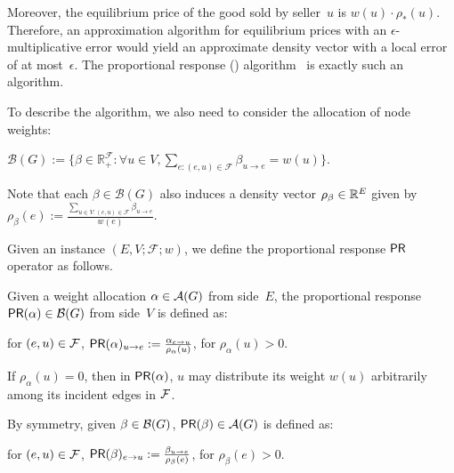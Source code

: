 Moreover, the equilibrium price of the good sold by seller~$u$ is $w(u) \cdot \rho_*(u)$. Therefore, an approximation algorithm for equilibrium prices with an $\epsilon$-multiplicative error would yield an approximate density vector with a local error of at most~$\epsilon$. 
The proportional response (\pr) algorithm~\cite{DBLP:conf/icalp/Zhang09} 
is exactly such an algorithm.


To describe the \pr algorithm,
we also need to consider the allocation of node weights:

$\mathcal{B}(G) := \{\beta \in \mathbb{R}^{\mathcal{F}}_+ : \forall u \in V, \sum_{e:(e,u) \in \mathcal{F}} \beta_{u \to e} = w(u)\}$. 


Note that each $\beta \in \mathcal{B}(G)$ also induces a density vector $\rho_{\beta} \in \mathbb{R}^E$ given by 
$\rho_\beta(e) := \frac{\sum_{u \in V: (e,u) \in \mathcal{F}} \beta_{u\to e}}{w(e)}.$



\begin{definition}
	\label{defn:pr-process1}
	Given an instance $(E, V; \mathcal{F}; w)$,
	we define the proportional response ${\mathsf {PR}}$ operator as follows.
	
		
	\begin{compactitem}
	\item Given a weight allocation $\alpha \in \mathcal {A}(G)$ from
	side~$E$, the proportional response
	${\mathsf {PR}}(\alpha) \in \mathcal {B}(G)$ from side~$V$ is defined as:
	
	for $(e,u) \in \mathcal {F}$,
	${\mathsf {PR}}(\alpha)_{u \to e} := \frac{\alpha_{e \to u}}{\rho_\alpha(u)}$,
	for $\rho_\alpha(u) > 0$.
	
	If	$\rho_\alpha(u) = 0$, then
	in ${\mathsf {PR}}(\alpha)$, $u$ may distribute its weight $w(u)$ arbitrarily among its incident edges in $\mathcal {F}$.
		
	
	\item By symmetry,
	given $\beta \in \mathcal {B}(G)$,
	${\mathsf {PR}}(\beta) \in \mathcal {A}(G)$ is defined as:
	
	for $(e, u) \in \mathcal {F}$, 
			${\mathsf {PR}}(\beta)_{e \to u} := \frac{\beta_{u \to e}}{\rho_\beta(e)}$,
		for $\rho_\beta(e) > 0$.
	
		
	\end{compactitem}

	
\end{definition}





